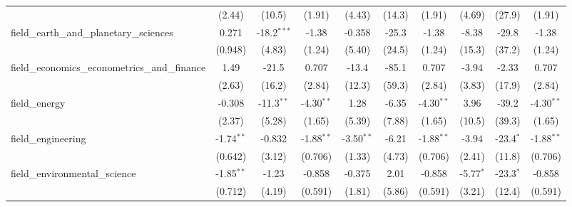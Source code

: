 \begin{tabular}{lccccccccc}
                                                               & (2.44)        & (10.5)         & (1.91)        & (4.43)        & (14.3)        & (1.91)        & (4.69)        & (27.9)         & (1.91)\\   
   field\_earth\_and\_planetary\_sciences                      & 0.271         & -18.2$^{***}$  & -1.38         & -0.358        & -25.3         & -1.38         & -8.38         & -29.8          & -1.38\\   
                                                               & (0.948)       & (4.83)         & (1.24)        & (5.40)        & (24.5)        & (1.24)        & (15.3)        & (37.2)         & (1.24)\\   
   field\_economics\_econometrics\_and\_finance                & 1.49          & -21.5          & 0.707         & -13.4         & -85.1         & 0.707         & -3.94         & -2.33          & 0.707\\   
                                                               & (2.63)        & (16.2)         & (2.84)        & (12.3)        & (59.3)        & (2.84)        & (3.83)        & (17.9)         & (2.84)\\   
   field\_energy                                               & -0.308        & -11.3$^{**}$   & -4.30$^{**}$  & 1.28          & -6.35         & -4.30$^{**}$  & 3.96          & -39.2          & -4.30$^{**}$\\   
                                                               & (2.37)        & (5.28)         & (1.65)        & (5.39)        & (7.88)        & (1.65)        & (10.5)        & (39.3)         & (1.65)\\   
   field\_engineering                                          & -1.74$^{**}$  & -0.832         & -1.88$^{**}$  & -3.50$^{**}$  & -6.21         & -1.88$^{**}$  & -3.94         & -23.4$^{*}$    & -1.88$^{**}$\\   
                                                               & (0.642)       & (3.12)         & (0.706)       & (1.33)        & (4.73)        & (0.706)       & (2.41)        & (11.8)         & (0.706)\\   
   field\_environmental\_science                               & -1.85$^{**}$  & -1.23          & -0.858        & -0.375        & 2.01          & -0.858        & -5.77$^{*}$   & -23.3$^{*}$    & -0.858\\   
                                                               & (0.712)       & (4.19)         & (0.591)       & (1.81)        & (5.86)        & (0.591)       & (3.21)        & (12.4)         & (0.591)\\   

\end{tabular}
